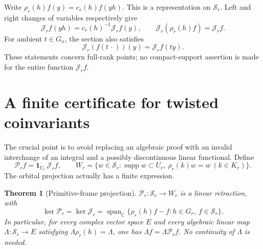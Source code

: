 \documentclass[11pt]{article}
\newtheorem{theorem}{Theorem}[section]
\theoremstyle{remark}\newtheorem{remark}[theorem]{Remark}
\newcommand{\SB}{\mathcal S}
\newcommand{\Orb}{\mathcal J}
\newcommand{\Prj}{\mathcal P}
\newcommand{\cc}{\mathbb C}
\newcommand{\one}{\mathbf 1}
\newcommand{\supp}{\operatorname{supp}}
\begin{document}
Write $\rho_r(h)f(y)=c_r(h)f(yh)$. This is a representation on $\SB_r$. Left and right changes of variables respectively give
\begin{equation}\label{eq:cov}
 \Orb_r f(yh)=c_r(h)^{-1}\Orb_r f(y),\qquad
 \Orb_r(\rho_r(h)f)=\Orb_r f.
\end{equation}
For ambient $t\in G_n$, the section also satisfies
\begin{equation}\label{eq:amb}
 \Orb_r(f(t\,\cdot))(y)=\Orb_r f(ty).
\end{equation}
These statements concern full-rank points; no compact-support assertion is made for the entire function $\Orb_r f$.

\section{A finite certificate for twisted coinvariants}\label{sec:projection}
The crucial point is to avoid replacing an algebraic proof with an invalid interchange of an integral and a possibly discontinuous linear functional. Define
\[
 \Prj_r f=\one_{U_r}\,\Orb_r f,\qquad
 W_r=\{w\in\SB_r:\supp w\subset U_r,\ \rho_r(k)w=w\ (k\in K_r)\}.
\]
The orbital projection actually has a finite expression.
\begin{theorem}[Primitive-frame projection]\label{thm:projection}
$\Prj_r:\SB_r\to W_r$ is a linear retraction, with
\[
 \ker\Prj_r=\ker\Orb_r
 =\operatorname{span}_{\cc}\{\rho_r(h)f-f:h\in G_r,\ f\in\SB_r\}.
\]
In particular, for every complex vector space $E$ and every algebraic linear map $\Lambda:\SB_r\to E$ satisfying $\Lambda\rho_r(h)=\Lambda$, one has $\Lambda f=\Lambda\Prj_r f$. No continuity of $\Lambda$ is needed.
\end{theorem}
\end{document}
